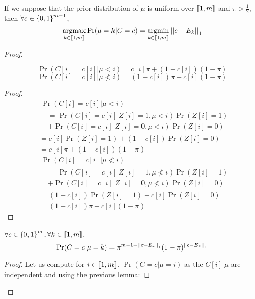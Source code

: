 \begin{thm}
    \label{thm:projection_appendix}
    If we suppose that the prior distribution of $\mu$ is uniform over $\left\llbracket1, m\right\rrbracket$ and $\pi > \frac{1}{2}$, then \(\forall c \in \left\{ 0, 1 \right\}^{m-1}\),
    \[\operatorname*{argmax}_{k \in \left\llbracket1, m\right\rrbracket} \Pr(\mu = k | C = c) = \operatorname*{argmin}_{k \in \left\llbracket1, m\right\rrbracket} \left|\left|c - E_k\right|\right|_1\]
\end{thm}

\begin{proof}
\begin{lemma}
    \[ \Pr(C[i] = c[i] | \mu < i) = c[i] \pi + (1 - c[i]) (1 - \pi) \]
    \[ \Pr(C[i] = c[i] | \mu \not< i) = (1 - c[i]) \pi + c[i] (1 - \pi) \]
\end{lemma}
\begin{proof}
    \begin{align}
        &\ \Pr(C[i] = c[i] | \mu < i)\\
        &\begin{aligned}
        &= \Pr(C[i] = c[i] | Z[i] = 1, \mu < i) \Pr(Z[i] = 1) \\
        &+ \Pr(C[i] = c[i] | Z[i] = 0, \mu < i) \Pr(Z[i] = 0)
        \end{aligned}\\
        &= c[i] \Pr(Z[i] = 1) + (1 - c[i]) \Pr(Z[i] = 0)\\
        &= c[i] \pi + (1 - c[i]) (1 - \pi)\\
        &\ \Pr(C[i] = c[i] | \mu \not< i)\\
        &\begin{aligned}
        &= \Pr(C[i] = c[i] | Z[i] = 1, \mu \not< i) \Pr(Z[i] = 1) \\
        &+ \Pr(C[i] = c[i] | Z[i] = 0, \mu \not< i) \Pr(Z[i] = 0)
        \end{aligned}\\
        &= (1 - c[i]) \Pr(Z[i] = 1) + c[i] \Pr(Z[i] = 0)\\
        &= (1 - c[i]) \pi + c[i] (1 - \pi)
    \end{align}
\end{proof}

\begin{lemma}
    \label{lemma:p_c_mu}
    $\forall c \in \left\{ 0, 1 \right\}^m, \forall k \in \left\llbracket1, m\right\rrbracket$,
    \[\Pr(C = c | \mu = k) = \pi^{m - 1 - \left|\left|c - E_k\right|\right|_1} (1 - \pi)^{\left|\left|c - E_k\right|\right|_1}\]
\end{lemma}
\begin{proof}
    Let us compute for $i \in \left\llbracket1, m\right\rrbracket$, $\Pr(C = c| \mu = i)$ as the $C[i] | \mu$ are independent and using the previous lemma:


\end{proof}
\end{proof}
